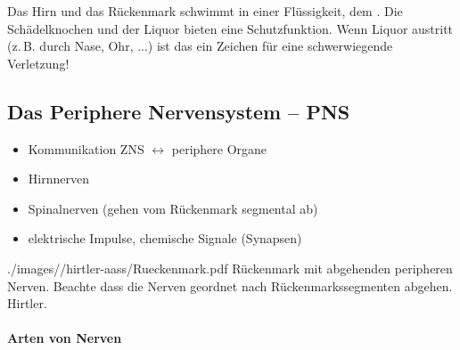 \noindent Das Hirn und das Rückenmark schwimmt in einer
Flüssigkeit, dem . Die
Schädelknochen und der Liquor bieten eine Schutzfunktion. 
Wenn Liquor austritt (z.\,B. durch Nase, Ohr, ...)  ist das
ein Zeichen für eine schwerwiegende Verletzung!



% 
% 

\subsection{Das Periphere Nervensystem -- PNS}


{%
\begin{itemize}
    \item Kommunikation ZNS ${\longleftrightarrow}$
    periphere  Organe
    \item Hirnnerven %
    \item Spinalnerven (gehen vom Rückenmark segmental ab)
    \item elektrische Impulse, chemische Signale (Synapsen)
\end{itemize}
}
{}
{./images//hirtler-aass/Rueckenmark.pdf}
{\AuthNotesPicLegalOk{}{}Rückenmark
mit abgehenden peripheren Nerven. Beachte dass die Nerven
geordnet nach Rückenmarkssegmenten abgehen.}
{Hirtler.}


\paragraph{Arten von Nerven}~

